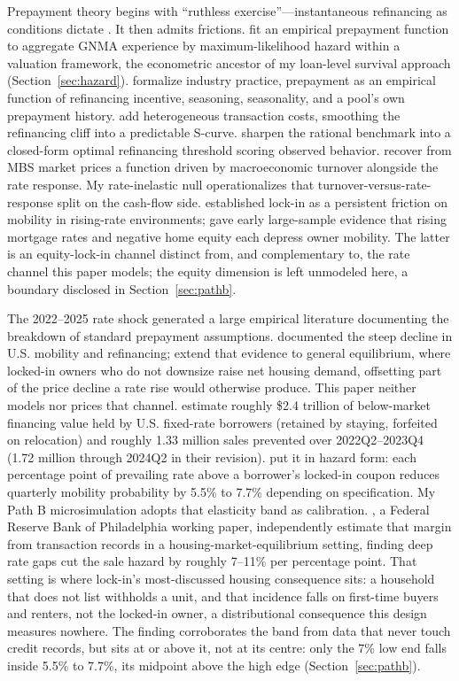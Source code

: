 \documentclass[12pt]{article}
\begin{document}
Prepayment theory begins with ``ruthless exercise''---instantaneous refinancing as conditions dictate \citep{dunn1981}. It then admits frictions. \citet{schwartz1989} fit an empirical prepayment function to aggregate GNMA experience by maximum-likelihood hazard within a valuation framework, the econometric ancestor of my loan-level survival approach (Section~\ref{sec:hazard}). \citet{richard1989} formalize industry practice, prepayment as an empirical function of refinancing incentive, seasoning, seasonality, and a pool's own prepayment history. \citet{stanton1995} add heterogeneous transaction costs, smoothing the refinancing cliff into a predictable S-curve. \citet{agarwal2013} sharpen the rational benchmark into a closed-form optimal refinancing threshold scoring observed behavior. \citet{chernov2018} recover from MBS market prices a function driven by macroeconomic turnover alongside the rate response. My rate-inelastic null operationalizes that turnover-versus-rate-response split on the cash-flow side. \citet{quigley1987,quigley2002} established lock-in as a persistent friction on mobility in rising-rate environments; \citet{ferreira2010} gave early large-sample evidence that rising mortgage rates and negative home equity each depress owner mobility. The latter is an equity-lock-in channel distinct from, and complementary to, the rate channel this paper models; the equity dimension is left unmodeled here, a boundary disclosed in Section~\ref{sec:pathb}.

The 2022--2025 rate shock generated a large empirical literature documenting the breakdown of standard prepayment assumptions. \citet{fonseca2024} documented the steep decline in U.S. mobility and refinancing; \citet{fonseca2026} extend that evidence to general equilibrium, where locked-in owners who do not downsize raise net housing demand, offsetting part of the price decline a rate rise would otherwise produce. This paper neither models nor prices that channel. \citet{batzer2024} estimate roughly \$2.4 trillion of below-market financing value held by U.S. fixed-rate borrowers (retained by staying, forfeited on relocation) and roughly 1.33 million sales prevented over 2022Q2--2023Q4 (1.72 million through 2024Q2 in their revision). \citet{liebersohn2024} put it in hazard form: each percentage point of prevailing rate above a borrower's locked-in coupon reduces quarterly mobility probability by 5.5\% to 7.7\% depending on specification. My Path B microsimulation adopts that elasticity band as calibration. \citet{graybill2026}, a Federal Reserve Bank of Philadelphia working paper, independently estimate that margin from transaction records in a housing-market-equilibrium setting, finding deep rate gaps cut the sale hazard by roughly 7--11\% per percentage point. That setting is where lock-in's most-discussed housing consequence sits: a household that does not list withholds a unit, and that incidence falls on first-time buyers and renters, not the locked-in owner, a distributional consequence this design measures nowhere. The finding corroborates the band from data that never touch credit records, but sits at or above it, not at its centre: only the 7\% low end falls inside 5.5\% to 7.7\%, its midpoint above the high edge (Section~\ref{sec:pathb}).
\end{document}
